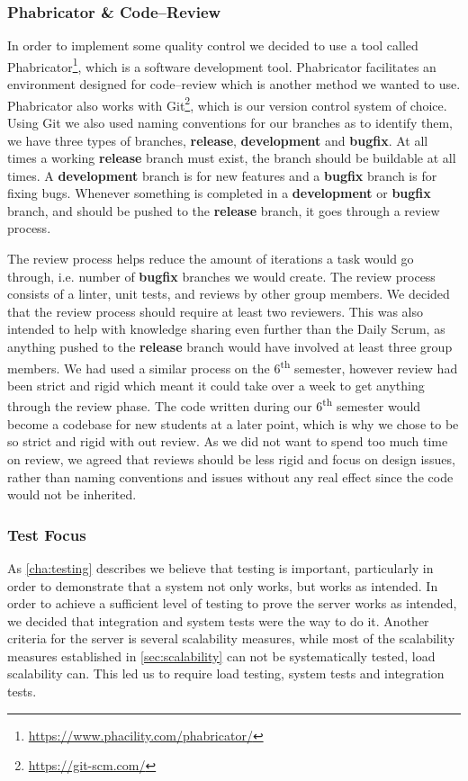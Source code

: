 \subsubsection{Phabricator \& Code--Review}
In order to implement some quality control we decided to use a tool called Phabricator\footnote{\url{https://www.phacility.com/phabricator/}}, which is a software development tool.
Phabricator facilitates an environment designed for code--review which is another method we wanted to use.
Phabricator also works with Git\footnote{\url{https://git-scm.com/}}, which is our version control system of choice.
Using Git we also used naming conventions for our branches as to identify them, we have three types of branches, \textbf{release}, \textbf{development} and \textbf{bugfix}.
At all times a working \textbf{release} branch must exist, the branch should be buildable at all times.
A \textbf{development} branch is for new features and a \textbf{bugfix} branch is for fixing bugs.
Whenever something is completed in a \textbf{development} or \textbf{bugfix} branch, and should be pushed to the \textbf{release} branch, it goes through a review process.

The review process helps reduce the amount of iterations a task would go through, i.e. number of \textbf{bugfix} branches we would create.
The review process consists of a linter, unit tests, and reviews by other group members.
We decided that the review process should require at least two reviewers.
This was also intended to help with knowledge sharing even further than the Daily Scrum, as anything pushed to the \textbf{release} branch would have involved at least three group members.
We had used a similar process on the 6\textsuperscript{th} semester, however review had been strict and rigid which meant it could take over a week to get anything through the review phase.
The code written during our 6\textsuperscript{th} semester would become a codebase for new students at a later point, which is why we chose to be so strict and rigid with out review.
As we did not want to spend too much time on review, we agreed that reviews should be less rigid and focus on design issues, rather than naming conventions and issues without any real effect since the code would not be inherited.
\subsubsection{Test Focus}
As \cref{cha:testing} describes we believe that testing is important, particularly in order to demonstrate that a system not only works, but works as intended.
In order to achieve a sufficient level of testing to prove the server works as intended, we decided that integration and system tests were the way to do it.
Another criteria for the server is several scalability measures, while most of the scalability measures established in \cref{sec:scalability} can not be systematically tested, load scalability can.
This led us to require load testing, system tests and integration tests.
